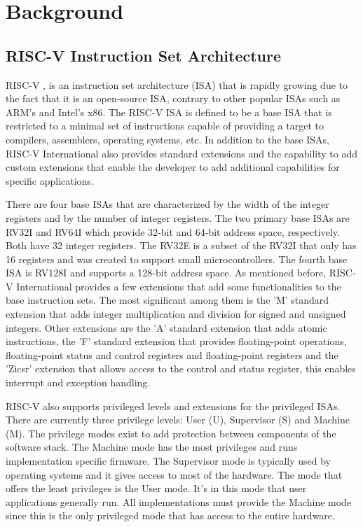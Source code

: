 \chapter{Background}
\label{chapter:background}

\section{RISC-V Instruction Set Architecture}
\label{section:RISCV}
RISC-V \cite{RISCV_manual_1}, \cite{RISCV_manual_2} is an instruction set architecture (ISA) that is rapidly growing due to the fact that it is an open-source ISA, contrary to other popular ISAs such as ARM's and Intel's x86. The RISC-V ISA is defined to be a base ISA that is restricted to a minimal set of instructions capable of providing a target to compilers, assemblers, operating systems, etc. In addition to the base ISAs, RISC-V International \cite{RISCV_International} also provides standard extensions and the capability to add custom extensions that enable the developer to add additional capabilities for specific applications.

There are four base ISAs that are characterized by the width of the integer registers and by the number of integer registers. The two primary base ISAs are RV32I and RV64I which provide 32-bit and 64-bit address space, respectively. Both have 32 integer registers. The RV32E is a subset of the RV32I that only has 16 registers and was created to support small microcontrollers. The fourth base ISA is RV128I and supports a 128-bit address space. As mentioned before, RISC-V International provides a few extensions that add some functionalities to the base instruction sets. The most significant among them is the 'M' standard extension that adds integer multiplication and division for signed and unsigned integers. Other extensions are the 'A' standard extension that adds atomic instructions, the 'F' standard extension that provides floating-point operations, floating-point status and control registers and floating-point registers and the 'Zicsr' extension that allows access to the control and status register, this enables interrupt and exception handling.

RISC-V also supports privileged levels and extensions for the privileged ISAs. There are currently three privilege levels: User (U), Supervisor (S) and Machine (M). The privilege modes exist to add protection between components of the software stack. The Machine mode has the most privileges and runs implementation specific firmware. The Supervisor mode is typically used by operating systems and it gives access to most of the hardware. The mode that offers the least privileges is the User mode. It's in this mode that user applications generally run. All implementations must provide the Machine mode since this is the only privileged mode that has access to the entire hardware.


